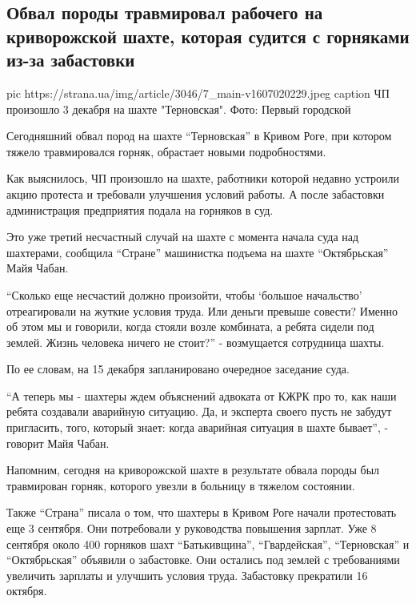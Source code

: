  
 
 
 
 
 
\subsection{Обвал породы травмировал рабочего на криворожской шахте, которая судится с горняками из-за забастовки}
\label{sec:03_12_2020.news.ua.strana.1.obval_krivoj_rog_shahta}

\ifcmt
pic https://strana.ua/img/article/3046/7_main-v1607020229.jpeg
caption ЧП произошло 3 декабря на шахте "Терновская". Фото: Первый городской
\fi

Сегодняшний обвал пород на шахте \enquote{Терновская} в Кривом Роге, при котором тяжело
травмировался горняк, обрастает новыми подробностями.

Как выяснилось, ЧП произошло на шахте, работники которой недавно устроили акцию
протеста и требовали улучшения условий работы. А после забастовки администрация
предприятия подала на горняков в суд. 

Это уже третий несчастный случай на шахте с момента начала суда над шахтерами,
сообщила \enquote{Стране} машинистка подъема на шахте \enquote{Октябрьская} Майя Чабан.

\enquote{Сколько еще несчастий должно произойти, чтобы 
\enquote{большое начальство}
отреагировали на жуткие условия труда. Или деньги превыше совести? Именно об
этом мы и говорили, когда стояли возле комбината, а ребята сидели под землей.
Жизнь человека ничего не стоит?} - возмущается сотрудница шахты. 

По ее словам, на 15 декабря запланировано очередное заседание суда.

\enquote{А теперь мы - шахтеры ждем объяснений адвоката от КЖРК про то, как наши ребята
создавали аварийную ситуацию. Да, и эксперта своего пусть не забудут
пригласить, того, который знает: когда аварийная ситуация в шахте бывает}, -
говорит Майя Чабан. 

Напомним, сегодня на криворожской шахте в результате обвала породы был
травмирован горняк, которого увезли в больницу в тяжелом состоянии.

Также \enquote{Страна} писала о том, что шахтеры в Кривом Роге начали протестовать еще
3 сентября. Они потребовали у руководства повышения зарплат. Уже 8 сентября
около 400 горняков шахт \enquote{Батькивщина}, \enquote{Гвардейская}, \enquote{Терновская} и
\enquote{Октябрьская} объявили о забастовке. Они остались под землей с требованиями
увеличить зарплаты и улучшить условия труда. Забастовку прекратили 16 октября.
